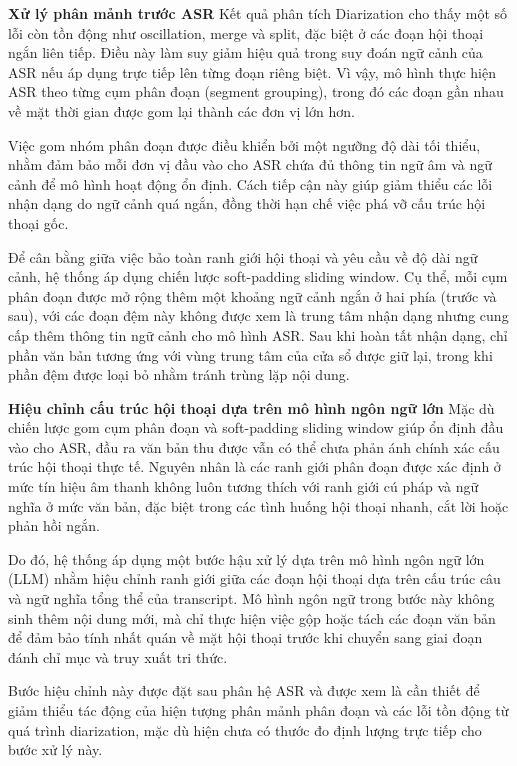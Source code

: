 \textbf{Xử lý phân mảnh trước ASR}
Kết quả phân tích Diarization cho thấy một số lỗi còn tồn động như oscillation, merge và split, đặc biệt ở các đoạn hội thoại ngắn liên tiếp. Điều này làm suy giảm hiệu quả trong suy đoán ngữ cảnh của ASR nếu áp dụng trực tiếp lên từng đoạn riêng biệt. Vì vậy, mô hình thực hiện ASR theo từng cụm phân đoạn (segment grouping), trong đó các đoạn gần nhau về mặt thời gian được gom lại thành các đơn vị lớn hơn.

Việc gom nhóm phân đoạn được điều khiển bởi một ngưỡng độ dài tối thiểu, nhằm đảm bảo mỗi đơn vị đầu vào cho ASR chứa đủ thông tin ngữ âm và ngữ cảnh để mô hình hoạt động ổn định. Cách tiếp cận này giúp giảm thiểu các lỗi nhận dạng do ngữ cảnh quá ngắn, đồng thời hạn chế việc phá vỡ cấu trúc hội thoại gốc.

Để cân bằng giữa việc bảo toàn ranh giới hội thoại và yêu cầu về độ dài ngữ cảnh, hệ thống áp dụng chiến lược soft-padding sliding window. Cụ thể, mỗi cụm phân đoạn được mở rộng thêm một khoảng ngữ cảnh ngắn ở hai phía (trước và sau), với các đoạn đệm này không được xem là trung tâm nhận dạng nhưng cung cấp thêm thông tin ngữ cảnh cho mô hình ASR. Sau khi hoàn tất nhận dạng, chỉ phần văn bản tương ứng với vùng trung tâm của cửa sổ được giữ lại, trong khi phần đệm được loại bỏ nhằm tránh trùng lặp nội dung.

\textbf{Hiệu chỉnh cấu trúc hội thoại dựa trên mô hình ngôn ngữ lớn}
Mặc dù chiến lược gom cụm phân đoạn và soft-padding sliding window giúp ổn định đầu vào cho ASR, đầu ra văn bản thu được vẫn có thể chưa phản ánh chính xác cấu trúc hội thoại thực tế. Nguyên nhân là các ranh giới phân đoạn được xác định ở mức tín hiệu âm thanh không luôn tương thích với ranh giới cú pháp và ngữ nghĩa ở mức văn bản, đặc biệt trong các tình huống hội thoại nhanh, cắt lời hoặc phản
hồi ngắn. 

Do đó, hệ thống áp dụng một bước hậu xử lý dựa trên mô hình ngôn ngữ lớn (LLM) nhằm hiệu chỉnh ranh giới giữa các đoạn hội thoại dựa trên cấu trúc câu và ngữ nghĩa tổng thể của transcript. Mô hình ngôn ngữ trong bước này không sinh thêm nội dung mới, mà chỉ thực hiện việc gộp hoặc tách các đoạn văn bản để đảm bảo tính nhất quán về mặt hội thoại trước khi chuyển sang giai đoạn đánh chỉ mục và truy xuất tri thức.

Bước hiệu chỉnh này được đặt sau phân hệ ASR và được xem là cần thiết để giảm thiểu tác động của hiện tượng phân mảnh phân đoạn và các lỗi tồn động từ quá trình diarization, mặc dù hiện chưa có thước đo định lượng trực tiếp cho bước xử lý này. 
